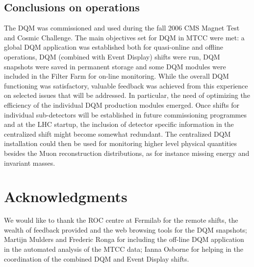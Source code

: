 \documentclass[a4paper]{cmspaper}
\begin{document}
\subsection{Conclusions on operations}


The DQM was commissioned and used during the fall 2006 CMS Magnet Test and Cosmic Challenge. The main objectives set for DQM in MTCC were met:
a global DQM application was established both for quasi-online and offline operations, DQM (combined with Event Display) shifts were run,
DQM snapshots were saved in permanent storage and some DQM modules were included in the Filter Farm for on-line monitoring. While the overall 
DQM functioning was satisfactory, valuable feedback was achieved from this experience on selected issues that will be addressed. 
In particular, the need of optimizing the efficiency of the individual DQM production modules emerged.
Once shifts for individual sub-detectors will be established in future commissioning programmes and at the LHC startup, 
the inclusion of detector specific information in the centralized shift might become somewhat redundant. 
The centralized DQM installation could then be used for monitoring higher level physical quantities besides the Muon reconstruction
distributions, as for instance  missing energy and invariant masses.



\section{Acknowledgments}

We would like to thank the ROC centre at Fermilab for the remote shifts, the wealth of feedback provided and the web
browsing tools for the DQM snapshots; Martijn Mulders and Frederic Ronga for including the off-line DQM application 
in the automated analysis of the MTCC data; Ianna Osborne for helping in the coordination of the combined DQM and Event Display shifts.


%
%
\newpage
\appendix 
\bigskip
\end{document}
